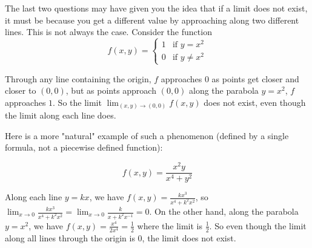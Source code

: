 \documentclass{ximera}
\begin{document}
	The last two questions may have given you the idea that if a limit does not exist, it must be because you get a different value by approaching along two different lines.  
	This is not always the case.  Consider the function
	\[f(x,y) = \begin{cases}
			1 & \text{if $y = x^2$}\\
			0 & \text{if $y \neq x^2$}
		 \end{cases}\]
		 
	Through any line containing the origin, $f$ approaches $0$ as points get closer and closer to $(0,0)$, but as points approach $(0,0)$ along the parabola 
	$y=x^2$, $f$ approaches $1$.  So the limit $\displaystyle\lim_{(x,y) \to (0,0)} f(x,y)$ does not exist, even though the limit along each line does.
	
	Here is a more "natural" example of such a phenomenon (defined by a single formula, not a piecewise defined function):
	
	\[
		f(x,y) = \frac{x^2y}{x^4+y^2}
	\]
	
	Along each line $y = kx$, we have 
	$f(x,y) = \frac{kx^3}{x^4+k^2x^2}$, so $\displaystyle\lim_{x \to 0} \frac{kx^3}{x^4+k^2x^2} = \displaystyle\lim_{x \to 0}\frac{k}{x+k^2x^{-1}} = 0$.  
	On the other hand, along the parabola $y=x^2$, we have $f(x,y) = \frac{x^4}{2x^4} = \frac{1}{2}$ where the limit is $\frac{1}{2}$.  So even though the limit
	along all lines through the origin is $0$, the limit does not exist.
	
	
	
	
	
	
\end{document}
